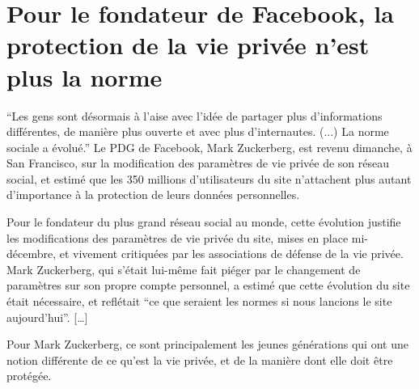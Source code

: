 \section{Pour le fondateur de Facebook, la protection de la vie privée n'est plus la norme}

``Les gens sont désormais à l'aise avec l'idée de partager plus d'informations différentes, de manière plus ouverte et avec plus d'internautes. (...) La norme sociale a évolué.'' Le PDG de Facebook, Mark Zuckerberg, est revenu dimanche, à San Francisco, sur la modification des paramètres de vie privée de son réseau social, et estimé que les 350 millions d'utilisateurs du site n'attachent plus autant d'importance à la protection de leurs données personnelles.

Pour le fondateur du plus grand réseau social au monde, cette évolution justifie les modifications des paramètres de vie privée du site, mises en place mi-décembre, et vivement critiquées par les associations de défense de la vie privée. Mark Zuckerberg, qui s'était lui-même fait piéger par le changement de paramètres sur son propre compte personnel, a estimé que cette évolution du site était nécessaire, et reflétait ``ce que seraient les normes si nous lancions le site aujourd'hui''. […]

Pour Mark Zuckerberg, ce sont principalement les jeunes générations qui ont une notion différente de ce qu'est la vie privée, et de la manière dont elle doit être protégée.
